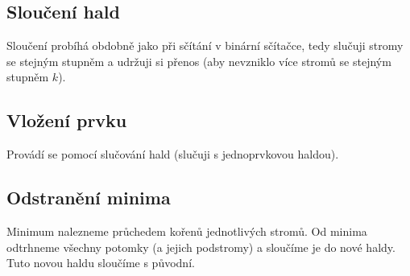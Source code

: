     \subsection{Sloučení hald}
      Sloučení probíhá obdobně jako při sčítání v binární sčítačce, tedy slučuji stromy se stejným stupněm a udržuji si přenos (aby nevzniklo více stromů se stejným stupněm $k$).

    \subsection{Vložení prvku}
      Provádí se pomocí slučování hald (slučuji s jednoprvkovou haldou).

    \subsection{Odstranění minima}
      Minimum nalezneme průchedem kořenů jednotlivých stromů. Od minima odtrhneme všechny potomky (a jejich podstromy) a sloučíme je do nové haldy.
      Tuto novou haldu sloučíme s původní.
